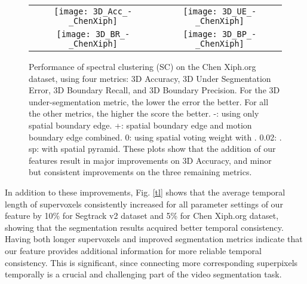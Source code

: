 \documentclass[runningheads]{llncs}
\begin{document}
\begin{figure}[!t]
\begin{center}
\begin{adjustbox}{max width=0.9\textwidth }
\begin{tabular}{cc}
\texttt{[image: 3D\_Acc\_-\_ChenXiph]}&
\texttt{[image: 3D\_UE\_-\_ChenXiph]}\\
\texttt{[image: 3D\_BR\_-\_ChenXiph]}&
\texttt{[image: 3D\_BP\_-\_ChenXiph]}\\
\end{tabular}
\end{adjustbox}
\end{center}
\caption{Performance of spectral clustering (SC) \cite{Galasso2013} on the Chen Xiph.org dataset, using four metrics: 3D Accuracy, 3D Under Segmentation Error, 3D Boundary Recall, and 3D Boundary Precision. For the 3D under-segmentation metric, the lower the error the better. For all the other metrics, the higher the score the better. -: using only spatial boundary edge. +: spatial boundary edge and motion boundary edge combined. 0: using spatial voting weight with . 0.02: . sp: with spatial pyramid. These plots show that the addition of our features result in major improvements on 3D Accuracy, and minor but consistent improvements on the three remaining metrics.}
\label{VSS_chen}
\end{figure}

In addition to these improvements, Fig. \ref{tl} shows that the average temporal length of supervoxels consistently increased for all parameter settings of our feature by 10\% for Segtrack v2 dataset and 5\% for Chen Xiph.org dataset, showing that the segmentation results acquired better temporal consistency. Having both longer supervoxels and improved segmentation metrics indicate that our feature provides additional information for more reliable temporal consistency. This is significant, since connecting more corresponding superpixels temporally is a crucial and challenging part of the video segmentation task.
\end{document}
